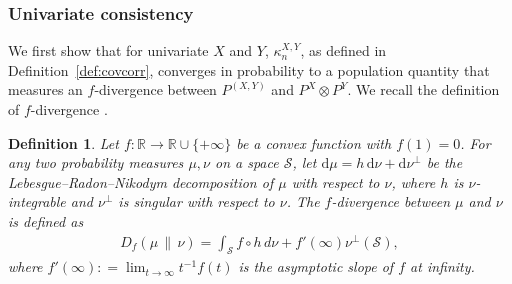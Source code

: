 \documentclass[11pt]{article}
\newtheorem{defn}{Definition}
\begin{document}
\subsubsection{Univariate consistency}
\label{Sec:UnivariateConsistency}

We first show that for univariate $X$ and $Y$, $\kappa_n^{X, Y}$, as defined in Definition~\ref{def:covcorr}, converges in probability to a population quantity that measures an $f$-divergence between $P^{(X, Y)}$ and $P^X \otimes P^Y$.  We recall the definition of $f$-divergence \citep[see, e.g.][Definition~8.2]{samworth2025statistics}.

\begin{defn}\label{def:f-divergence}
Let $f: \mathbb{R} \to \mathbb{R} \cup \{+\infty\}$ be a convex function with $f(1)=0$. For any two probability measures $\mu, \nu$ on a space $\mathcal{S}$, let $\mathrm{d} \mu = h \, \mathrm{d}\nu + \mathrm{d} \nu^{\perp}$ be the Lebesgue--Radon--Nikodym decomposition of $\mu$ with respect to $\nu$, where $h$ is $\nu$-integrable and $\nu^{\perp}$ is singular with respect to $\nu$. The \emph{$f$-divergence} between $\mu$ and $\nu$ is defined as 
\begin{align}
    D_f(\mu \,\|\, \nu) = \int_{\mathcal{S}} f\circ h \, d\nu + f'(\infty) \nu^{\perp}(\mathcal{S}),  \label{eq: fDivergenceDefinition}
\end{align}
where $f'(\infty) : = \lim_{t \to \infty} t^{-1}f(t)$ is the asymptotic slope of $f$ at infinity.
\end{defn}
\end{document}
